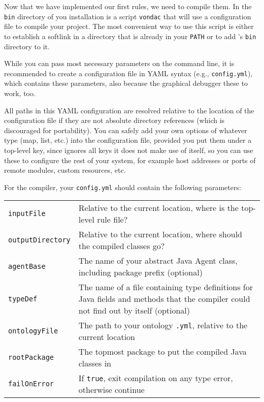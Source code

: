 Now that we have implemented our first rules, we need to compile them. In the
\texttt{bin} directory of you \vonda installation is a script \texttt{vondac}
that will use a configuration file to compile your project. The most convenient
way to use this script is either to establish a softlink in a directory that is
already in your \texttt{PATH} or to add \vonda's \texttt{bin} directory to it.

While you can pass most necessary parameters on the command line, it
is recommended to create a configuration file in YAML syntax (e.g.,
\texttt{config.yml}), which contains these parameters, also because the
graphical debugger these to work, too.

All paths in this YAML configuration are resolved relative to the location of
the configuration file if they are not absolute directory references (which is
discouraged for portability). You can safely add your own options of whatever
type (map, list, etc.) into the configuration file, provided you put them under
a top-level key, since \vonda ignores all keys it does not make use of itself,
so you can use these to configure the rest of your system, for example host
addresses or ports of remote modules, custom resources, etc.

For the \vonda compiler, your \texttt{config.yml} should contain the
following parameters:\\

\begin{tabular}{lp{}}
\texttt{inputFile}& Relative to the current location, where is the
                    top-level rule file?\\
\texttt{outputDirectory}& Relative to the current location, where
                          should the compiled classes go?\\
\texttt{agentBase}& The name of your abstract Java Agent class,
                    including package prefix (optional)\\
\texttt{typeDef}& The name of a file containing type definitions
                    for Java fields and methods that the compiler
                    could not find out by itself (optional)\\
\texttt{ontologyFile}&The path to your ontology \texttt{.yml},
                       relative to the current location\\
\texttt{rootPackage}&The topmost package to put the compiled Java
                      classes in\\
\texttt{failOnError}&If \texttt{true}, exit compilation on any
                       type error, otherwise continue\\
\end{tabular}\\

